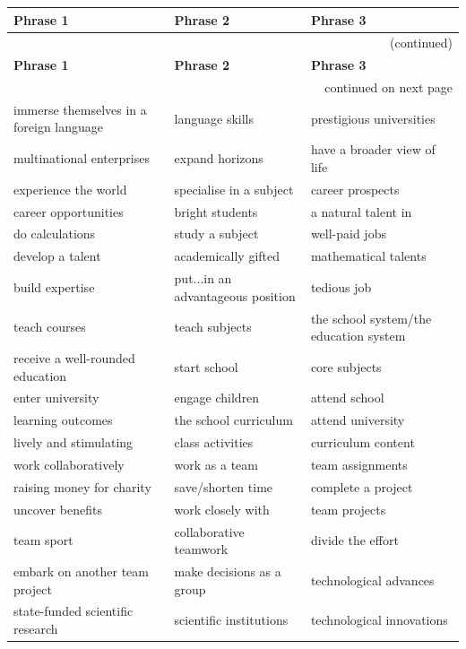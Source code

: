 \documentclass[10pt,a4paper]{article}
\begin{document}
\setlength{\tabcolsep}{8pt}
\renewcommand{\arraystretch}{1.3}
{\large
\begin{longtable}{@{}*{3}{p{}}@{}}
\toprule
\textbf{Phrase 1} & \textbf{Phrase 2} & \textbf{Phrase 3} \\ \midrule
\endfirsthead
\multicolumn{3}{r}{\footnotesize (continued)} \\
\toprule
\textbf{Phrase 1} & \textbf{Phrase 2} & \textbf{Phrase 3} \\ \midrule
\endhead
\midrule
\multicolumn{3}{r}{\footnotesize continued on next page} \\
\endfoot
\bottomrule
\endlastfoot
immerse themselves in a foreign language & language skills & prestigious universities \\
multinational enterprises & expand horizons & have a broader view of life \\
experience the world & specialise in a subject & career prospects \\
career opportunities & bright students & a natural talent in \\
do calculations & study a subject & well-paid jobs \\
develop a talent & academically gifted & mathematical talents \\
build expertise & put...in an advantageous position & tedious job \\
teach courses & teach subjects & the school system/the education system \\
receive a well-rounded education & start school & core subjects \\
enter university & engage children & attend school \\
learning outcomes & the school curriculum & attend university \\
lively and stimulating & class activities & curriculum content \\
work collaboratively & work as a team & team assignments \\
raising money for charity & save/shorten time & complete a project \\
uncover benefits & work closely with & team projects \\
team sport & collaborative teamwork & divide the effort \\
embark on another team project & make decisions as a group & technological advances \\
state-funded scientific research & scientific institutions & technological innovations \\

\end{longtable}}
\end{document}

